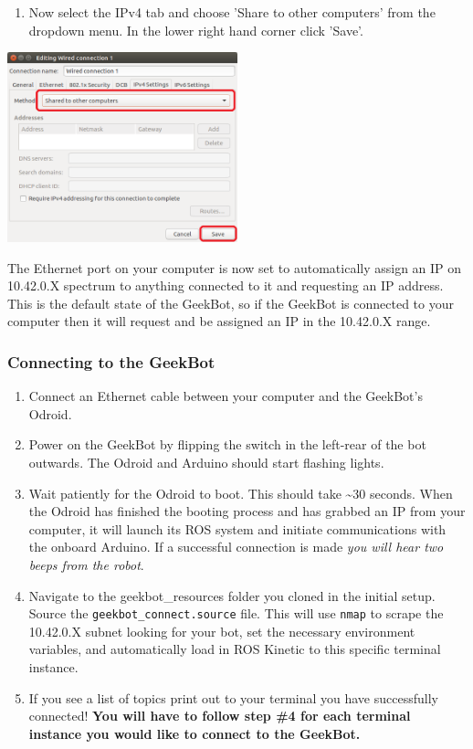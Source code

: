 \begin{enumerate}
\def\labelenumi{\arabic{enumi}.}
\setcounter{enumi}{3}
\tightlist
\item
  Now select the IPv4 tab and choose 'Share to other computers' from the
  dropdown menu. In the lower right hand corner click 'Save'.
\end{enumerate}

\includegraphics[width=0.5\textwidth,height=\textheight]{figures/geekbot/eth_config/ipv4_shared.png}

The Ethernet port on your computer is now set to automatically assign an
IP on 10.42.0.X spectrum to anything connected to it and requesting an
IP address. This is the default state of the GeekBot, so if the GeekBot
is connected to your computer then it will request and be assigned an IP
in the 10.42.0.X range.

\hypertarget{connecting-to-the-geekbot}{%
\subsubsection{Connecting to the
GeekBot}\label{connecting-to-the-geekbot}}

\begin{enumerate}
\def\labelenumi{\arabic{enumi}.}
\tightlist
\item
  Connect an Ethernet cable between your computer and the GeekBot's
  Odroid.
\item
  Power on the GeekBot by flipping the switch in the left-rear of the
  bot outwards. The Odroid and Arduino should start flashing lights.
\item
  Wait patiently for the Odroid to boot. This should take
  \textasciitilde30 seconds. When the Odroid has finished the booting
  process and has grabbed an IP from your computer, it will launch its
  ROS system and initiate communications with the onboard Arduino. If a
  successful connection is made \emph{you will hear two beeps from the
  robot}.
\item
  Navigate to the geekbot\_resources folder you cloned in the initial
  setup. Source the \texttt{geekbot\_connect.source} file. This will use
  \texttt{nmap} to scrape the 10.42.0.X subnet looking for your bot, set
  the necessary environment variables, and automatically load in ROS
  Kinetic to this specific terminal instance.
\item
  If you see a list of topics print out to your terminal you have
  successfully connected! \textbf{You will have to follow step \#4 for
  each terminal instance you would like to connect to the GeekBot.}
\end{enumerate}

